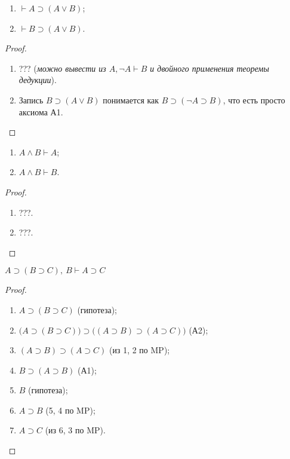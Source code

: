 \begin{lemma}\leavevmode
    \begin{enumerate}[label=\arabic*)]
        \item $\vdash A \supset (A \lor B)$;
        \item $\vdash B \supset (A \lor B)$.
    \end{enumerate}
\end{lemma}
\begin{proof}\leavevmode
    \begin{enumerate}[label=\arabic*)]
        \item ??? (\textit{можно вывести из $A, \neg A \vdash B$ и двойного применения теоремы дедукции}).
        \item Запись $B \supset (A \lor B)$ понимается как $B \supset (\neg A \supset B)$, что есть просто аксиома А1.
    \end{enumerate}
\end{proof}

\begin{lemma}\leavevmode
    \begin{enumerate}[label=\arabic*)]
        \item $A \land B \vdash A$;
        \item $A \land B \vdash B$.
    \end{enumerate}
\end{lemma}
\begin{proof}\leavevmode
    \begin{enumerate}[label=\arabic*)]
        \item ???.
        \item ???.
    \end{enumerate}
\end{proof}

\begin{lemma}\label{th:implication_and_middle}
    $A \supset (B \supset C),\ B \vdash A \supset C$
\end{lemma}
\begin{proof}\leavevmode
    \begin{enumerate}
        \item $A \supset (B \supset C)$ (гипотеза);
        \item $\big(A \supset (B \supset C)\big) \supset \big((A \supset B) \supset (A \supset C)\big)$ (А2);
        \item $(A \supset B) \supset (A \supset C)$ (из 1, 2 по MP);
        \item $B \supset (A \supset B)$ (А1);
        \item $B$ (гипотеза);
        \item $A \supset B$ (5, 4 по MP);
        \item $A \supset C$ (из 6, 3 по MP).
    \end{enumerate}
\end{proof}

